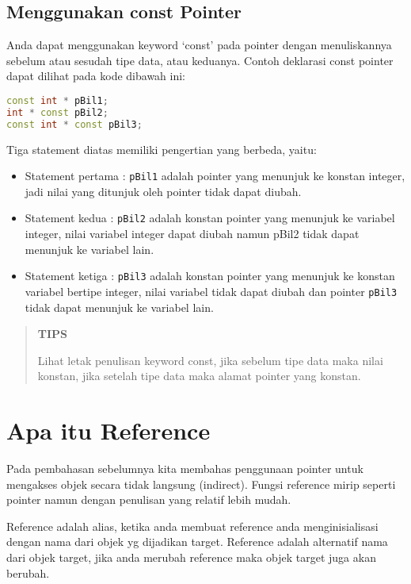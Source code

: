 \subsection{Menggunakan const Pointer}\label{menggunakan-const-pointer}

Anda dapat menggunakan keyword `const' pada pointer dengan menuliskannya
sebelum atau sesudah tipe data, atau keduanya. Contoh deklarasi const
pointer dapat dilihat pada kode dibawah ini:

\begin{lstlisting}[language=c++]
const int * pBil1;
int * const pBil2;
const int * const pBil3;
\end{lstlisting}

Tiga statement diatas memiliki pengertian yang berbeda, yaitu:

\begin{itemize}
\tightlist
\item
  Statement pertama : \texttt{pBil1} adalah pointer yang menunjuk ke
  konstan integer, jadi nilai yang ditunjuk oleh pointer tidak dapat
  diubah.
\item
  Statement kedua : \texttt{pBil2} adalah konstan pointer yang menunjuk
  ke variabel integer, nilai variabel integer dapat diubah namun pBil2
  tidak dapat menunjuk ke variabel lain.
\item
  Statement ketiga : \texttt{pBil3} adalah konstan pointer yang menunjuk
  ke konstan variabel bertipe integer, nilai variabel tidak dapat diubah
  dan pointer \texttt{pBil3} tidak dapat menunjuk ke variabel lain.
\end{itemize}

\begin{quotation}
	\textbf{TIPS}
	
	Lihat
	letak penulisan keyword const, jika sebelum tipe data maka nilai
	konstan, jika setelah tipe data maka alamat pointer yang konstan.
\end{quotation}
 

\section{Apa itu Reference}\label{apa-itu-reference}

Pada pembahasan sebelumnya kita membahas penggunaan pointer untuk
mengakses objek secara tidak langsung (indirect). Fungsi reference mirip
seperti pointer namun dengan penulisan yang relatif lebih mudah.

Reference adalah alias, ketika anda membuat reference anda
menginisialisasi dengan nama dari objek yg dijadikan target. Reference
adalah alternatif nama dari objek target, jika anda merubah reference
maka objek target juga akan berubah.

